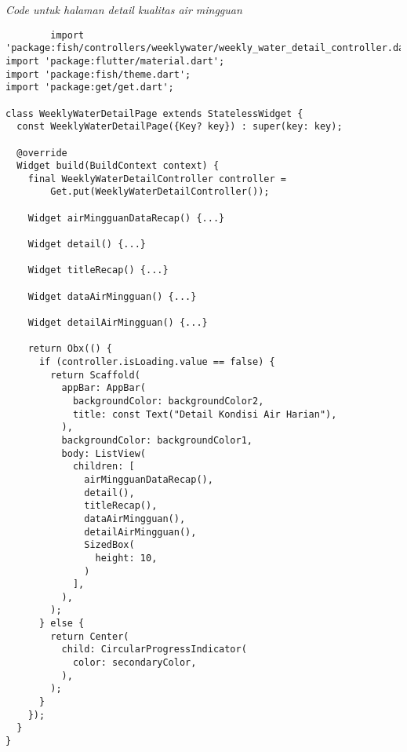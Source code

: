     \textit{Code untuk halaman detail kualitas air mingguan}
	\begin{lstlisting}
        import 'package:fish/controllers/weeklywater/weekly_water_detail_controller.dart';
import 'package:flutter/material.dart';
import 'package:fish/theme.dart';
import 'package:get/get.dart';

class WeeklyWaterDetailPage extends StatelessWidget {
  const WeeklyWaterDetailPage({Key? key}) : super(key: key);

  @override
  Widget build(BuildContext context) {
    final WeeklyWaterDetailController controller =
        Get.put(WeeklyWaterDetailController());

    Widget airMingguanDataRecap() {...}

    Widget detail() {...}

    Widget titleRecap() {...}

    Widget dataAirMingguan() {...}

    Widget detailAirMingguan() {...}

    return Obx(() {
      if (controller.isLoading.value == false) {
        return Scaffold(
          appBar: AppBar(
            backgroundColor: backgroundColor2,
            title: const Text("Detail Kondisi Air Harian"),
          ),
          backgroundColor: backgroundColor1,
          body: ListView(
            children: [
              airMingguanDataRecap(),
              detail(),
              titleRecap(),
              dataAirMingguan(),
              detailAirMingguan(),
              SizedBox(
                height: 10,
              )
            ],
          ),
        );
      } else {
        return Center(
          child: CircularProgressIndicator(
            color: secondaryColor,
          ),
        );
      }
    });
  }
}   
	\end{lstlisting}

